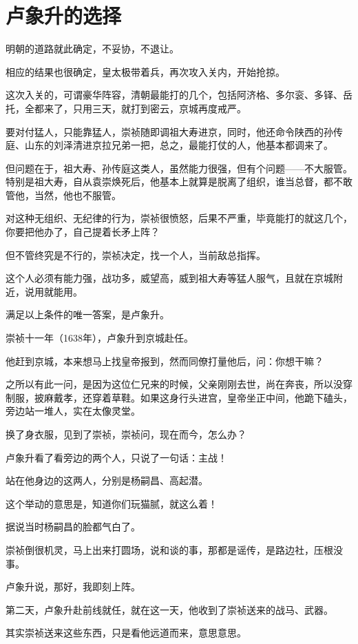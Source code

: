 \section{卢象升的选择}
\ifnum{}
	\begin{multicols}{\theparacolNo}
\fi
明朝的道路就此确定，不妥协，不退让。

相应的结果也很确定，皇太极带着兵，再次攻入关内，开始抢掠。

这次入关的，可谓豪华阵容，清朝最能打的几个，包括阿济格、多尔衮、多铎、岳托，全都来了，只用三天，就打到密云，京城再度戒严。

要对付猛人，只能靠猛人，崇祯随即调祖大寿进京，同时，他还命令陕西的孙传庭、山东的刘泽清进京拉兄弟一把，总之，最能打仗的人，他基本都调来了。

但问题在于，祖大寿、孙传庭这类人，虽然能力很强，但有个问题——不大服管。特别是祖大寿，自从袁崇焕死后，他基本上就算是脱离了组织，谁当总督，都不敢管他，当然，他也不服管。

对这种无组织、无纪律的行为，崇祯很愤怒，后果不严重，毕竟能打的就这几个，你要把他办了，自己提着长矛上阵？

但不管终究是不行的，崇祯决定，找一个人，当前敌总指挥。

这个人必须有能力强，战功多，威望高，威到祖大寿等猛人服气，且就在京城附近，说用就能用。

满足以上条件的唯一答案，是卢象升。

崇祯十一年（1638年），卢象升到京城赴任。

他赶到京城，本来想马上找皇帝报到，然而同僚打量他后，问：你想干嘛？

之所以有此一问，是因为这位仁兄来的时候，父亲刚刚去世，尚在奔丧，所以没穿制服，披麻戴孝，还穿着草鞋。如果这身行头进宫，皇帝坐正中间，他跪下磕头，旁边站一堆人，实在太像灵堂。

换了身衣服，见到了崇祯，崇祯问，现在而今，怎么办？

卢象升看了看旁边的两个人，只说了一句话：主战！

站在他身边的这两人，分别是杨嗣昌、高起潜。

这个举动的意思是，知道你们玩猫腻，就这么着！

据说当时杨嗣昌的脸都气白了。

崇祯倒很机灵，马上出来打圆场，说和谈的事，那都是谣传，是路边社，压根没事。

卢象升说，那好，我即刻上阵。

第二天，卢象升赴前线就任，就在这一天，他收到了崇祯送来的战马、武器。

其实崇祯送来这些东西，只是看他远道而来，意思意思。


\end{multicols}

